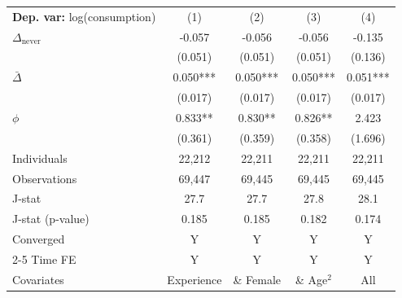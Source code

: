 \begin{tabular}{l cccc} \toprule  \textbf{Dep. var:}  log(consumption) 
                    &\multicolumn{1}{c}{(1)}   &\multicolumn{1}{c}{(2)}   &\multicolumn{1}{c}{(3)}   &\multicolumn{1}{c}{(4)}   \\

\addlinespace
$\Delta_{\text{never}}$&      -0.057   &      -0.056   &      -0.056   &      -0.135   \\
                    &     (0.051)   &     (0.051)   &     (0.051)   &     (0.136)   \\

\addlinespace
$\bar{\Delta}$      &       0.050***&       0.050***&       0.050***&       0.051***\\
                    &     (0.017)   &     (0.017)   &     (0.017)   &     (0.017)   \\

\addlinespace
$\phi$              &       0.833** &       0.830** &       0.826** &       2.423   \\
                    &     (0.361)   &     (0.359)   &     (0.358)   &     (1.696)   \\
\addlinespace
Individuals         &      22,212   &      22,211   &      22,211   &      22,211   \\
Observations        &      69,447   &      69,445   &      69,445   &      69,445   \\
J-stat              &        27.7   &        27.7   &        27.8   &        28.1   \\
J-stat (p-value)    &       0.185   &       0.185   &       0.182   &       0.174   \\
Converged           &           Y   &           Y   &           Y   &           Y   \\
\cmidrule{2-5} Time FE & Y & Y & Y & Y \\ Covariates & Experience & \& Female & \& Age$^2$ & All \\ \bottomrule \end{tabular}
